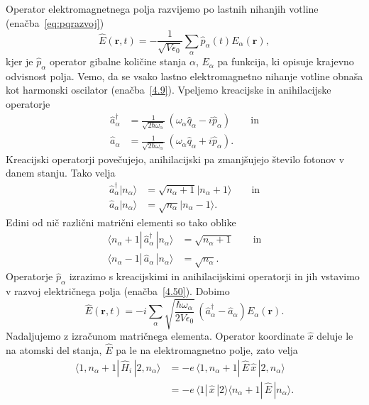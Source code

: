 Operator elektromagnetnega polja razvijemo po lastnih nihanjih votline (enačba~\ref{eq:pqrazvoj}) 
\begin{equation}
\hat{E}(\mathbf{r},t)=-\frac{1}{\sqrt{V\epsilon_{0}}}\sum_{\alpha}
\hat{p}_{\alpha}(t)E_{\alpha}(\mathbf{r}),
\label{4.50}
\end{equation}
kjer je $\hat{p}_{\alpha}$ operator gibalne količine stanja $\alpha$, $E_{\alpha}$
pa funkcija, ki opisuje krajevno odvisnost polja. Vemo, da se vsako lastno
elektromagnetno nihanje votline obnaša kot harmonski oscilator (enačba~\ref{4.9}).
Vpeljemo kreacijske in anihilacijske operatorje
\begin{align}
\hat{a}_{\alpha}^{\dagger} & =  \frac{1}{\sqrt{2\hbar\omega_{\alpha}}}\,
(\omega_{\alpha}\hat{q}_{\alpha}-i\hat{p}_{\alpha}) \qquad \mathrm{in} \\
\hat{a}_{\alpha} & =  \frac{1}{\sqrt{2\hbar\omega_{\alpha}}}\,(\omega_{\alpha}\hat{q}_{\alpha}+i\hat{p}_{\alpha}).
\end{align}
 Kreacijski operatorji povečujejo, anihilacijski pa zmanjšujejo število
fotonov v danem stanju. Tako velja
\begin{align}
\hat{a}_{\alpha}^{\dagger}|n_{\alpha}\rangle & =  \sqrt{n_{\alpha}+1}
|n_{\alpha}+1\rangle\qquad \mathrm{in} \\
\hat{a}_{\alpha}|n_{\alpha}\rangle & =  \sqrt{n_{\alpha}}|n_{\alpha}-1\rangle.
\end{align}
Edini od nič različni matrični elementi so tako oblike
\begin{align}
\langle n_\alpha +1|\, \hat{a}_{\alpha}^{\dagger}\,|n_{\alpha}\rangle & = 
\sqrt{n_{\alpha}+1} \qquad \mathrm{in} \label{eq:ankr.1}\\
\langle n_\alpha-1|\,\hat{a}_{\alpha}\,|n_{\alpha}\rangle & =  \sqrt{n_{\alpha}}.
\label{eq:ankr}
\end{align}
Operatorje $\hat{p}_{\alpha}$ izrazimo s kreacijskimi in anihilacijskimi
operatorji in jih vstavimo v razvoj električnega polja (enačba~\ref{4.50}). Dobimo
\begin{equation}
\hat{E}(\mathbf{r},t)=-i\sum_{\alpha}\sqrt{\frac{\hbar\omega_{\alpha}}{2V\epsilon_{0}}}\,
\left(\hat{a}_{\alpha}^{\dagger}-\hat{a}_{\alpha}\right)E_{\alpha}(\mathbf{r}).
\label{4.53}
\end{equation}
Nadaljujemo z izračunom matričnega elementa. Operator koordinate
$\hat{x}$ deluje le na atomski del stanja, $\hat{E}$ pa le na elektromagnetno
polje, zato velja 
\begin{align}
\langle1,n_{\alpha}+1|\,\hat{H}_{i}\,|2,n_{\alpha}\rangle & =  -e\,
\langle1,n_{\alpha}+1|\,\hat{E}\,\hat{x}\,|2,n_{\alpha}\rangle \\
 & =  -e\,\langle1|\,\hat{x}\,|2\rangle\langle n_{\alpha}+1|\,\hat{E}\,|n_{\alpha}\rangle.
\end{align}
